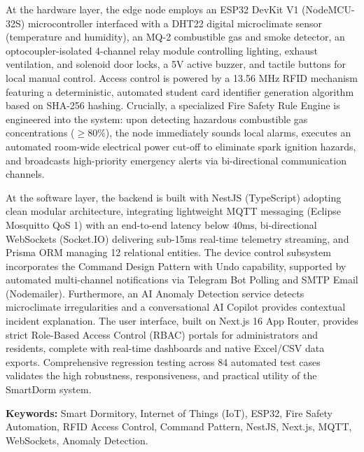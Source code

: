 At the hardware layer, the edge node employs an ESP32 DevKit V1 (NodeMCU-32S) microcontroller interfaced with a DHT22 digital microclimate sensor (temperature and humidity), an MQ-2 combustible gas and smoke detector, an optocoupler-isolated 4-channel relay module controlling lighting, exhaust ventilation, and solenoid door locks, a 5V active buzzer, and tactile buttons for local manual control. Access control is powered by a 13.56 MHz RFID mechanism featuring a deterministic, automated student card identifier generation algorithm based on SHA-256 hashing. Crucially, a specialized Fire Safety Rule Engine is engineered into the system: upon detecting hazardous combustible gas concentrations ($\ge 80\%$), the node immediately sounds local alarms, executes an automated room-wide electrical power cut-off to eliminate spark ignition hazards, and broadcasts high-priority emergency alerts via bi-directional communication channels.

At the software layer, the backend is built with NestJS (TypeScript) adopting clean modular architecture, integrating lightweight MQTT messaging (Eclipse Mosquitto QoS 1) with an end-to-end latency below $40\text{ms}$, bi-directional WebSockets (Socket.IO) delivering sub-15ms real-time telemetry streaming, and Prisma ORM managing 12 relational entities. The device control subsystem incorporates the Command Design Pattern with Undo capability, supported by automated multi-channel notifications via Telegram Bot Polling and SMTP Email (Nodemailer). Furthermore, an AI Anomaly Detection service detects microclimate irregularities and a conversational AI Copilot provides contextual incident explanation. The user interface, built on Next.js 16 App Router, provides strict Role-Based Access Control (RBAC) portals for administrators and residents, complete with real-time dashboards and native Excel/CSV data exports. Comprehensive regression testing across 84 automated test cases validates the high robustness, responsiveness, and practical utility of the SmartDorm system.

\vspace{0.5cm}
\noindent \textbf{Keywords:} Smart Dormitory, Internet of Things (IoT), ESP32, Fire Safety Automation, RFID Access Control, Command Pattern, NestJS, Next.js, MQTT, WebSockets, Anomaly Detection.

\newpage
